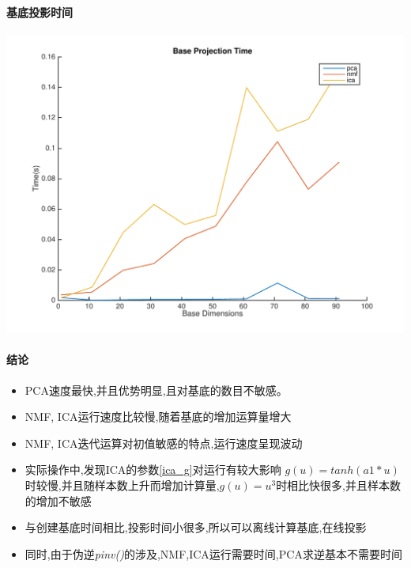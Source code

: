 \paragraph{基底投影时间}
\begin{center}
\begin{minipage}[t]{\linewidth}
\center
{
\includegraphics[width=\MyFactor\textwidth]{Img/pni_baseproj} 
\label{fig:ica_base}
}
\end{minipage}
\medskip
\end{center}

\paragraph{结论}
\begin{itemize}
	\item PCA速度最快,并且优势明显,且对基底的数目不敏感。
	\item NMF, ICA运行速度比较慢,随着基底的增加运算量增大
	\item NMF, ICA迭代运算对初值敏感的特点,运行速度呈现波动
	\item 实际操作中,发现ICA的参数\ref{ica_g}对运行有较大影响
		$g(u)=tanh(a1*u)$时较慢,并且随样本数上升而增加计算量,$g(u) = u^3$时相比快很多,并且样本数的增加不敏感
	\item 与创建基底时间相比,投影时间小很多,所以可以离线计算基底,在线投影
	\item 同时,由于伪逆\textit{pinv()}的涉及,NMF,ICA运行需要时间,PCA求逆基本不需要时间
\end{itemize}



